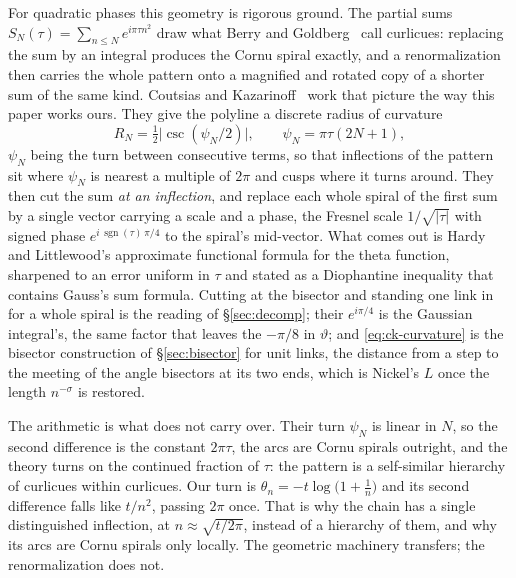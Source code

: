 \documentclass[11pt]{article}
\theoremstyle{definition}
\begin{document}
For quadratic phases this geometry is rigorous ground. The partial sums
$S_N(\tau)=\sum_{n\le N}e^{i\pi\tau n^{2}}$ draw what Berry and
Goldberg~\cite{BerryGoldberg1988} call curlicues: replacing the sum by an
integral produces the Cornu spiral exactly, and a renormalization then carries
the whole pattern onto a magnified and rotated copy of a shorter sum of the same
kind. Coutsias and Kazarinoff~\cite{CoutsiasKazarinoff1987,CoutsiasKazarinoff1998}
work that picture the way this paper works ours. They give the polyline a
discrete radius of curvature
\begin{equation}\label{eq:ck-curvature}
R_N=\tfrac12\bigl|\csc(\psi_N/2)\bigr|,
\qquad \psi_N=\pi\tau(2N+1),
\end{equation}
$\psi_N$ being the turn between consecutive terms, so that inflections of the
pattern sit where $\psi_N$ is nearest a multiple of $2\pi$ and cusps where it
turns around. They then cut the sum \emph{at an inflection}, and replace each
whole spiral of the first sum by a single vector carrying a scale and a phase,
the Fresnel scale $1/\sqrt{|\tau|}$ with signed phase
$e^{i\,\operatorname{sgn}(\tau)\,\pi/4}$ to the spiral's mid-vector. What
comes out is Hardy and Littlewood's approximate functional formula for the theta
function, sharpened to an error uniform in $\tau$ and stated as a Diophantine
inequality that contains Gauss's sum formula. Cutting at the bisector and standing
one link in for a whole spiral is the reading of \S\ref{sec:decomp}; their
$e^{i\pi/4}$ is the Gaussian integral's, the same factor that leaves the
$-\pi/8$ in $\vartheta$; and \eqref{eq:ck-curvature} is the bisector construction of
\S\ref{sec:bisector} for unit links, the distance from a step to the meeting of
the angle bisectors at its two ends, which is Nickel's $L$ once the length
$n^{-\sigma}$ is restored.

The arithmetic is what does not carry over. Their turn $\psi_N$ is linear in
$N$, so the second difference is the constant $2\pi\tau$, the arcs are Cornu
spirals outright, and the theory turns on the continued fraction of $\tau$:
the pattern is a self-similar hierarchy of curlicues within curlicues. Our turn
is $\theta_n=-t\log\bigl(1+\tfrac1n\bigr)$ and its second difference falls like
$t/n^{2}$, passing $2\pi$ once. That is why the chain has a single distinguished
inflection, at $n\approx\sqrt{t/2\pi}$, instead of a hierarchy of them, and why its
arcs are Cornu spirals only locally. The geometric machinery transfers; the
renormalization does not.
\end{document}
